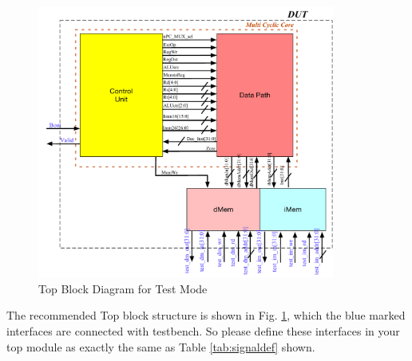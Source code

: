 \documentclass[a4paper]{article}
\begin{document}
\begin{figure}[ht]
	\centering
	\includegraphics[height=9cm]{images/l2ModulesTest.pdf}
	\caption{Top Block Diagram for Test Mode}
	\label{fig:moduletest}
\end{figure}
The recommended Top block structure is shown in Fig. \ref{fig:moduletest}, which the blue marked interfaces are connected with testbench. So please define these interfaces in your top module as exactly the same as Table \ref{tab:signaldef} shown.
\end{document}
